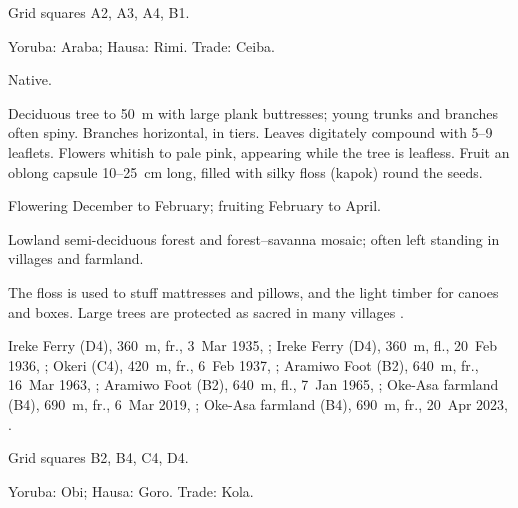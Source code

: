  Grid squares A2, A3, A4, B1.

\begin{center}
\end{center}

\label{sp:MAL02}

 

 Yoruba: Araba; Hausa: Rimi. Trade:
Ceiba.

 Native.

 Deciduous tree to 50~m with large plank
buttresses; young trunks and branches often spiny. Branches
horizontal, in tiers. Leaves digitately compound with 5--9 leaflets.
Flowers whitish to pale pink, appearing while the tree is leafless.
Fruit an oblong capsule 10--25~cm long, filled with silky floss
(kapok) round the seeds.

 Flowering December to February; fruiting February
to April.

 Lowland semi-deciduous forest and forest--savanna
mosaic; often left standing in villages and farmland.

 The floss is used to stuff mattresses and pillows, and
the light timber for canoes and boxes. Large trees are protected as
sacred in many villages \citep{burkill1985,keay1989}.

 Ireke Ferry (D4), 360~m, fr., 3~Mar 1935, ;
Ireke Ferry (D4), 360~m, fl., 20~Feb 1936, ;
Okeri (C4), 420~m, fr., 6~Feb 1937, ;
Aramiwo Foot (B2), 640~m, fr., 16~Mar 1963, ;
Aramiwo Foot (B2), 640~m, fl., 7~Jan 1965, ;
Oke-Asa farmland (B4), 690~m, fr., 6~Mar 2019, ;
Oke-Asa farmland (B4), 690~m, fr., 20~Apr 2023, .

 Grid squares B2, B4, C4, D4.

\begin{center}
\end{center}

\label{sp:MAL03}

 

 Yoruba: Obi; Hausa: Goro. Trade: Kola.

